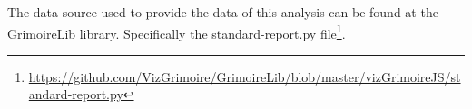 \documentclass[a4wide,11pt]{report}
\begin{document}
The data source used to provide the data of this analysis can be found at the GrimoireLib library. Specifically the standard-report.py file\footnote{\url{https://github.com/VizGrimoire/GrimoireLib/blob/master/vizGrimoireJS/standard-report.py}}.




%
\end{document}
